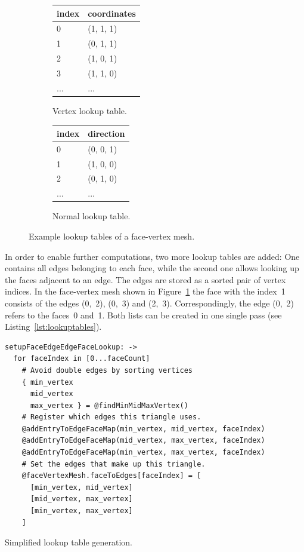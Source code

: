 \documentclass[../ClassicThesis.tex]{subfiles}
\begin{document}
\begin{figure}
\begin{subfigure}[t]{0.32\textwidth}
\begin{tabular}{ | l | l | }
      index & coordinates \\ \hline
      0 & (1, 1, 1) \\ \hline
      1 & (0, 1, 1) \\ \hline
      2 & (1, 0, 1) \\ \hline
      3 & (1, 1, 0) \\ \hline
      ... & ... \\
      \hline
    \end{tabular}
    \caption{Vertex lookup table.}
  \end{subfigure}
  \begin{subfigure}[t]{0.32\textwidth}
    \centering
    \begin{tabular}{ | l | l | }
      \hline
      index & direction \\ \hline
      0 & (0, 0, 1) \\ \hline
      1 & (1, 0, 0) \\ \hline
      2 & (0, 1, 0) \\ \hline
      ... & ... \\
      \hline
    \end{tabular}
    \caption{Normal lookup table.}
  \end{subfigure}
  \caption{Example lookup tables of a face-vertex mesh.}
  \label{fig:facevertexmesh}
\end{figure}

In order to enable further computations, two more lookup tables are added: One contains all edges belonging to each face, while the second one allows looking up the faces adjacent to an edge. The edges are stored as a sorted pair of vertex indices. In the face-vertex mesh shown in Figure~\ref{fig:facevertexmesh} the face with the index~1 consists of the edges (0,~2), (0,~3) and (2,~3). Correspondingly, the edge (0,~2) refers to the faces~0 and~1. Both lists can be created in one single pass (see Listing~\ref{lst:lookuptables}).

\begin{listing}
\begin{verbatim}
setupFaceEdgeEdgeFaceLookup: ->
  for faceIndex in [0...faceCount]
    # Avoid double edges by sorting vertices
    { min_vertex
      mid_vertex
      max_vertex } = @findMinMidMaxVertex()
    # Register which edges this triangle uses.
    @addEntryToEdgeFaceMap(min_vertex, mid_vertex, faceIndex)
    @addEntryToEdgeFaceMap(mid_vertex, max_vertex, faceIndex)
    @addEntryToEdgeFaceMap(min_vertex, max_vertex, faceIndex)
    # Set the edges that make up this triangle.
    @faceVertexMesh.faceToEdges[faceIndex] = [
      [min_vertex, mid_vertex]
      [mid_vertex, max_vertex]
      [min_vertex, max_vertex]
    ]
\end{verbatim}
\caption{Simplified lookup table generation.}
\label{lst:lookuptables}
\end{listing}
\end{document}
